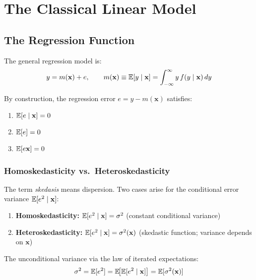 
\chapter[The Linear Model]{The Classical Linear Model}
\label{chap_LinearModel}

\section{The Regression Function}
\label{sec_RegFunction}

The general regression model is:
\begin{equation}
  y = m(\mathbf{x}) + e, \qquad
  m(\mathbf{x}) \equiv \mathbb{E}[y \mid \mathbf{x}]
  = \int_{-\infty}^{\infty} y\, f(y \mid \mathbf{x})\, dy
\end{equation}

By construction, the regression error $e = y - m(\mathbf{x})$ satisfies:
\begin{enumerate}[label=(\roman*)]
  \item $\mathbb{E}[e \mid \mathbf{x}] = 0$
  \item $\mathbb{E}[e] = 0$
  \item $\mathbb{E}[e\mathbf{x}] = 0$
\end{enumerate}

\subsection{Homoskedasticity vs.\ Heteroskedasticity}

The term \emph{skedasis} means dispersion. Two cases arise for the conditional
error variance $\mathbb{E}[e^2 \mid \mathbf{x}]$:

\begin{enumerate}[label=\alph*)]
  \item \textbf{Homoskedasticity:}\; $\mathbb{E}[e^2\mid\mathbf{x}] = \sigma^2$
    (constant conditional variance)
  \item \textbf{Heteroskedasticity:}\;
    $\mathbb{E}[e^2\mid\mathbf{x}] = \sigma^2(\mathbf{x})$
    (skedastic function; variance depends on $\mathbf{x}$)
\end{enumerate}

The unconditional variance via the law of iterated expectations:
\begin{equation}
  \sigma^2 = \mathbb{E}[e^2] = \mathbb{E}\!\bigl[\mathbb{E}[e^2 \mid \mathbf{x}]\bigr]
  = \mathbb{E}[\sigma^2(\mathbf{x})]
\end{equation}

